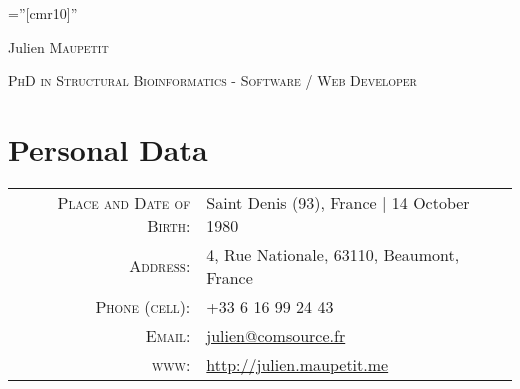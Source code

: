 \documentclass[a4paper,10pt]{article}
\begin{document}

\thispagestyle{empty} %

\font\fb=''[cmr10]'' %

\par{\centering
		{\Huge Julien \textsc{Maupetit}
	}\bigskip\par}
\par{\centering
		{\textsc{PhD in Structural Bioinformatics - Software / Web Developer}
	}\bigskip\par}

\section{Personal Data}

\begin{tabular}{rl}
    \textsc{Place and Date of Birth:} & Saint Denis (93), France  | 14 October 1980 \\
    \textsc{Address:}   & 4, Rue Nationale, 63110, Beaumont, France \\
    \textsc{Phone (cell):}     & +33 6 16 99 24 43\\
    \textsc{Email:}     & \href{mailto:julien@comsource.fr}{julien@comsource.fr}\\
    \textsc{www:}       & \href{http://julien.maupetit.me}{http://julien.maupetit.me}\\
\end{tabular}


\end{document}
